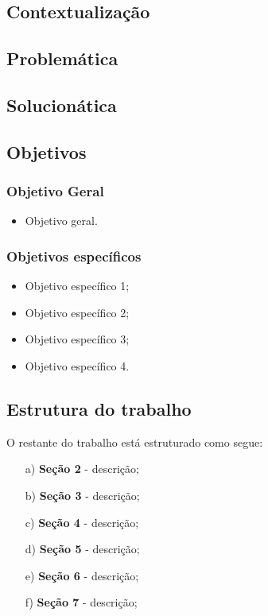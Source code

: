 \subsection*{Contextualização}

\subsection*{Problemática}

\subsection*{Solucionática}

\subsection*{Objetivos}

\subsubsection*{Objetivo Geral}

\begin{itemize}
	\item Objetivo geral.
\end{itemize}

\subsubsection*{Objetivos específicos}
\begin{itemize}
\item Objetivo específico 1;
\item Objetivo específico 2;
\item Objetivo específico 3;
\item Objetivo específico 4.
\end{itemize}

\subsection*{Estrutura do trabalho}

O restante do trabalho está estruturado como segue:

\begin{enumerate}
\item[a)] \textbf{Seção 2} - descrição;
\item[b)] \textbf{Seção 3} - descrição;
\item[c)] \textbf{Seção 4} - descrição;
\item[d)] \textbf{Seção 5} - descrição;
\item[e)] \textbf{Seção 6} - descrição;
\item[f)] \textbf{Seção 7} - descrição;
\end{enumerate}
